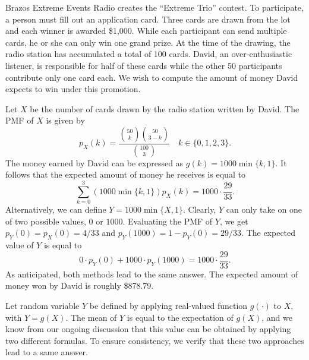 \begin{example}
Brazos Extreme Events Radio creates the ``Extreme Trio'' contest.
To participate, a person must fill out an application card.
Three cards are drawn from the lot and each winner is awarded \$1,000.
While each participant can send multiple cards, he or she can only win one grand prize.
At the time of the drawing, the radio station has accumulated a total of 100 cards.
David, an over-enthusiastic listener, is responsible for half of these cards while the other 50 participants contribute only one card each.
We wish to compute the amount of money David expects to win under this promotion.

Let $X$ be the number of cards drawn by the radio station written by David.
The PMF of $X$ is given by
\begin{equation*}
p_X(k) = \frac{\binom{50}{k} \binom{50}{3-k}}{\binom{100}{3}}
\quad k \in \{ 0, 1, 2, 3 \}.
\end{equation*}
The money earned by David can be expressed as $g(k) = 1000 \min \{ k,1 \}$.
It follows that the expected amount of money he receives is equal to
\begin{equation*}
\sum_{k=0}^3 \left( 1000 \min \{ k, 1 \} \right) p_X(k)
= 1000 \cdot \frac{29}{33} .
\end{equation*}
Alternatively, we can define $Y = 1000 \min \{ X, 1 \}$.
Clearly, $Y$ can only take on one of two possible values, $0$ or $1000$.
Evaluating the PMF of $Y$, we get $p_Y(0) = p_X(0) = 4/33$ and $p_Y(1000) = 1 - p_Y(0) = 29/33$.
The expected value of $Y$ is equal to
\begin{equation*}
0 \cdot p_Y(0) + 1000 \cdot p_Y(1000) = 1000 \cdot \frac{29}{33} .
\end{equation*}
As anticipated, both methods lead to the same answer.
The expected amount of money won by David is roughly \$878.79.
\end{example}


Let random variable $Y$ be defined by applying real-valued function $g(\cdot)$ to $X$, with $Y = g(X)$.
The mean of $Y$ is equal to the expectation of $g(X)$, and we know from our ongoing discussion that this value can be obtained by applying two different formulas.
To ensure consistency, we verify that these two approaches lead to a same answer.

